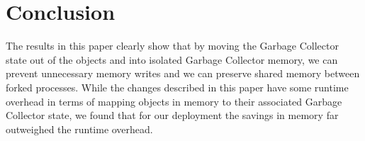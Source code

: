 \documentclass{article}
\begin{document}
\begin{sloppypar}
\section{Conclusion}

The results in this paper clearly show that by moving the Garbage Collector state out of the objects and into isolated Garbage Collector memory, we can prevent unnecessary memory writes and we can preserve shared memory between forked processes.  While the changes described in this paper have some runtime overhead in terms of mapping objects in memory to their associated Garbage Collector state, we found that for our deployment the savings in memory far outweighed the runtime overhead. 

\newpage
\onecolumn
\nocite{*}



\end{sloppypar}
\end{document}
